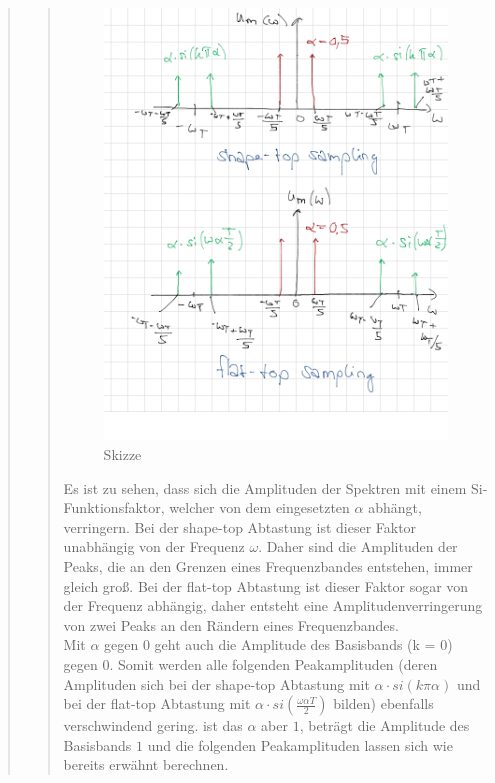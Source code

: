 \begin{quote}
\begin{quote}
        
         \begin{figure}[H]
            \centering
                \includegraphics[scale=0.3, trim = 0cm 0cm 0cm 0cm,
                clip]{./Bilder/vorbereitungsskizze}
                    \caption{Skizze}
        \end{figure}
        
        Es ist zu sehen, dass sich die Amplituden der Spektren mit einem
        Si-Funktionsfaktor, welcher von dem eingesetzten $\alpha$ abhängt, verringern.
        Bei der shape-top Abtastung ist dieser Faktor unabhängig von der Frequenz
        $\omega$. Daher sind die Amplituden der Peaks, die an den Grenzen eines
        Frequenzbandes entstehen, immer gleich groß.        
        Bei der flat-top Abtastung ist dieser Faktor sogar von der Frequenz abhängig, daher entsteht 
        eine Amplitudenverringerung von zwei Peaks an den Rändern eines
        Frequenzbandes.\\
        Mit $\alpha$ gegen $0$ geht auch die Amplitude des Basisbands (k = $0$) gegen
        $0$. Somit werden alle folgenden Peakamplituden (deren Amplituden sich bei der
        shape-top Abtastung mit $\alpha \cdot si(k \pi \alpha)$ und bei der flat-top
        Abtastung mit $\alpha \cdot si(\frac{\omega \alpha T}{2})$ bilden) ebenfalls
        verschwindend gering. ist das $\alpha$ aber $1$, beträgt die Amplitude des
        Basisbands $1$ und die folgenden Peakamplituden lassen sich wie bereits
        erwähnt berechnen.
        

\end{quote}
\end{quote}
